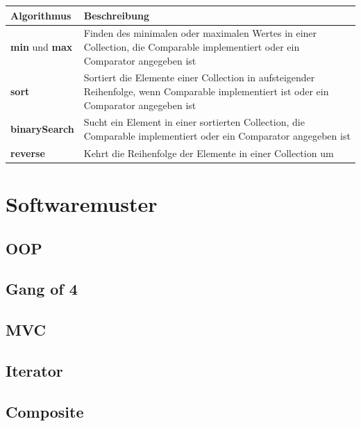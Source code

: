 \documentclass[12pt]{scrartcl}
\begin{document}
\begin{table}[H]
	\centering
	\begin{tabular}{ p{4cm} | p{11cm} }
		Algorithmus                   & Beschreibung                                                                                                                             \\
		\hline
		\textbf{min} und \textbf{max} & Finden des minimalen oder maximalen Wertes in einer Collection, die Comparable implementiert oder ein Comparator angegeben ist           \\
		\hline
		\textbf{sort}                 & Sortiert die Elemente einer Collection in aufsteigender Reihenfolge, wenn Comparable implementiert ist oder ein Comparator angegeben ist \\
		\hline
		\textbf{binarySearch}         & Sucht ein Element in einer sortierten Collection, die Comparable implementiert oder ein Comparator angegeben ist                         \\
		\hline
		\textbf{reverse}              & Kehrt die Reihenfolge der Elemente in einer Collection um                                                                                \\
	\end{tabular}
\end{table}

\section{Softwaremuster}
\subsection{OOP}
\subsection{Gang of 4}
\subsection{MVC}
\subsection{Iterator}
\subsection{Composite}

\pagebreak
\end{document}
